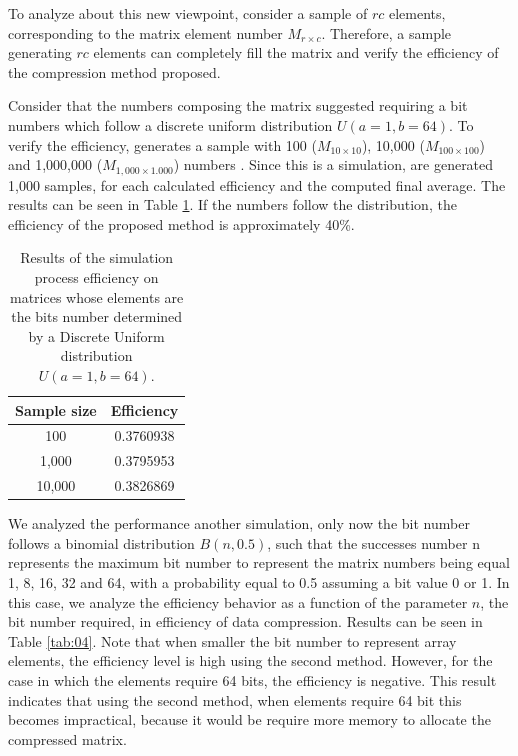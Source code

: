 \documentclass[10pt]{article}
\begin{document}
To analyze about this new viewpoint, consider a sample of $rc$ elements, corresponding to the matrix element number $M_{r \times c}$. Therefore, a sample generating $rc$ elements can completely fill the matrix and verify the efficiency of the compression method proposed.

Consider that the numbers composing the matrix suggested requiring a bit numbers which follow a discrete uniform distribution $U(a=1,b=64)$. To verify the efficiency, generates a sample with 100 ($M_{10 \times 10}$), 10,000 ($M_{100 \times 100}$) and 1,000,000 ($M_{1,000 \times 1.000}$) numbers . Since this is a simulation, are generated 1,000 samples, for each calculated efficiency and the computed final average. The results can be seen in Table \ref{tab:03}. If the numbers follow the distribution, the efficiency of the proposed method is approximately 40\%.

\begin{table}[h]
  \centering
  \caption{Results of the simulation process efficiency on matrices whose elements are the bits number determined by a Discrete Uniform distribution $U(a=1,b=64)$.}
 \begin{tabular}{cc}
    \hline
    Sample size& Efficiency \\
    \hline
     100	& 0.3760938 \\
     1,000 	& 0.3795953 \\
     10,000 	& 0.3826869 \\
    \hline
 \end{tabular}
 \label{tab:03}
\end{table}

We analyzed the performance another simulation, only now the bit number follows a binomial distribution $B(n,0.5) $, such that the successes number n represents the maximum bit number to represent the matrix numbers being equal 1, 8, 16, 32 and 64, with a probability equal to 0.5 assuming a bit value 0 or 1. In this case, we analyze the efficiency behavior as a function of the parameter $n$, the bit number required, in efficiency of data compression. Results can be seen in Table \ref{tab:04}. Note that when smaller the bit number to represent array elements, the efficiency level is high using the second method. However, for the case in which the elements require 64 bits, the efficiency is negative. This result indicates that using the second method, when elements require 64 bit this becomes impractical, because it would be require more memory to allocate the compressed matrix.
\end{document}
